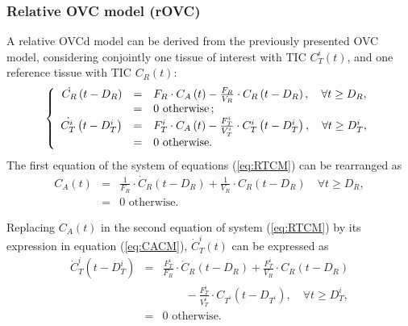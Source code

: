 \subsubsection{Relative OVC model (rOVC)}
A relative OVCd model can be derived from the previously presented OVC model, considering conjointly one tissue of interest with TIC $C_T^i(t)$, and one reference tissue with TIC $C_R(t)$:
\begin{equation}
\left\{
\begin{array}{r c l}
\dot{C_R} \left( t - D_R \right) &=& F_R \cdot C_A \left( t \right) - \frac{F_R}{V_R} \cdot C_R \left( t - D_R \right), \quad \forall t \geq D_R,  \\
 &=& 0 \textrm{ otherwise\,;} \\
\dot{C_T^i} \left( t - D_T^i \right) &=& F_T^i \cdot C_A \left( t \right) - \frac{F_T^i}{V_T^i} \cdot C_T^i \left( t - D_T^i \right), \quad \forall t \geq D_T^i,  \\
 &=& 0 \textrm{ otherwise.}
\end{array}
\right.
\label{eq:RTCM}
\end{equation}
The first equation of the system of equations (\ref{eq:RTCM}) can be rearranged as
\begin{equation}
\begin{array}{rcl}
C_A(t) &=&\frac{1}{F_{R}} \cdot \dot{C}_{R}(t - D_{R}) + \frac{1}{V_{R}} \cdot {C_{R}}(t - D_R) \quad\forall t \geq D_{R}, \\
&=& \textrm{0 otherwise.}
\end{array}
\label{eq:CACM}
\end{equation}

Replacing $C_A(t)$ in the second equation of system (\ref{eq:RTCM}) by its expression in equation (\ref{eq:CACM}), $\dot{C}_T^i(t)$ can be expressed as
\begin{equation}
\begin{array}{rcl}
\dot{C}_T^i \left(t - D_T^i\right) &= & \frac{F_T^i}{F_{R}} \cdot \dot{C}_{R}\left(t-D_R\right) + \frac{F_T^i}{V_R} \cdot C_{R} \left(t - D_{R}\right)  \\
& & \qquad - \frac{F_T^i}{V_T^i} \cdot C_{T^i} \left(t - D_{T^i}\right), \quad \forall t \geq D_T^i,\\
&=& \textrm{0 otherwise.}
\end{array}
\label{eq:RTDEF1}
\end{equation}

